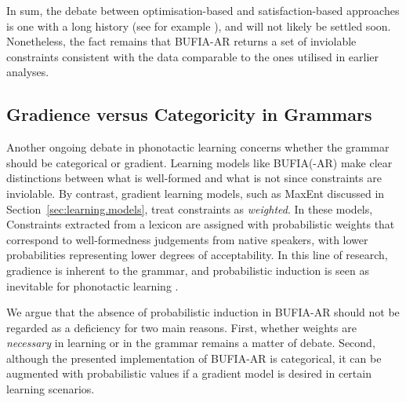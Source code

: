 \documentclass{CUP-JNL-PHO}%
\theoremstyle{definition}
\numberwithin{equation}{section}
\theoremstyle{definition}
\begin{document}
In sum, the debate between optimisation-based and satisfaction-based
approaches is one with a long history (see for example
\citet{Simon1956}), and will not likely be settled soon. Nonetheless,
the fact remains that BUFIA-AR returns a set of inviolable constraints
consistent with the data comparable to the ones utilised in earlier
analyses.

\subsection{Gradience versus Categoricity in Grammars}
\label{sec:discussion.grammar}

Another ongoing debate in phonotactic learning concerns whether the
grammar should be categorical or gradient. Learning models like
BUFIA(-AR) make clear distinctions between what is well-formed and
what is not since constraints are inviolable. By contrast, gradient
learning models, such as MaxEnt \citep{hayes2008maximum, GouskovaGallagher2020} discussed in Section~\ref{sec:learning.models},
treat constraints as \textit{weighted}. In these models,
Constraints extracted from a lexicon are assigned with probabilistic weights that correspond to well-formedness judgements
from native speakers, with lower probabilities representing lower degrees
of acceptability. In this line of research, gradience is inherent to
the grammar, and probabilistic induction is seen as inevitable for
phonotactic learning \citep{hayes2008maximum, wilson2018accidental}.

We argue that the absence of probabilistic induction in BUFIA-AR
should not be regarded as a deficiency for two main reasons.  First,
whether weights are \textit{necessary} in learning or in the grammar
remains a matter of debate. Second, although the presented
implementation of BUFIA-AR is categorical, it can be augmented with
probabilistic values if a gradient model is desired in certain
learning scenarios.
\end{document}

